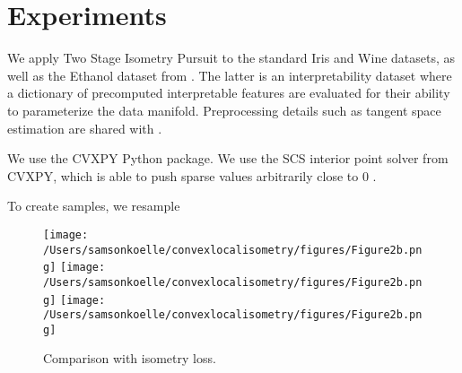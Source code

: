 \section{Experiments}
\label{sec:experiments}

We apply Two Stage Isometry Pursuit to the standard Iris and Wine datasets, as well as the Ethanol dataset from \citet{Koelle2022-no}.
The latter is an interpretability dataset where a dictionary of precomputed interpretable features are evaluated for their ability to parameterize the data manifold.
Preprocessing details such as tangent space estimation are shared with \citet{Koelle2022-no}.

We use the CVXPY Python package.
We use the SCS interior point solver from CVXPY, which is able to push sparse values arbitrarily close to 0 \cite{cvxpy_sparse_solution}.

To create samples, we resample

\begin{figure}
\centering
{}
{\texttt{[image: /Users/samsonkoelle/convexlocalisometry/figures/Figure2b.png]}}
{\texttt{[image: /Users/samsonkoelle/convexlocalisometry/figures/Figure2b.png]}}
{\texttt{[image: /Users/samsonkoelle/convexlocalisometry/figures/Figure2b.png]}}
\caption{Comparison with isometry loss.}
\label{fig:boxplots}
\end{figure}

